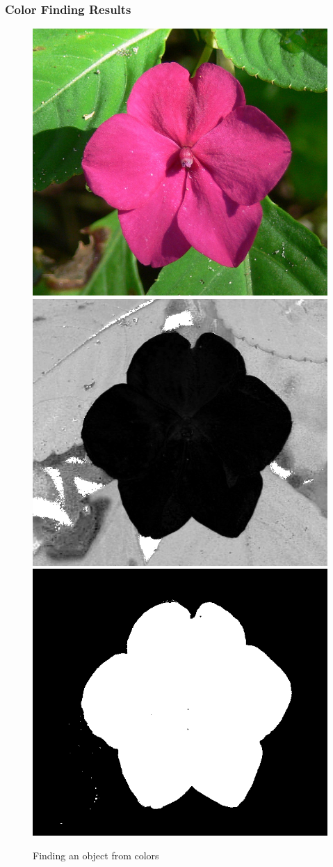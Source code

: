 \documentclass{beamer}
\begin{document}
\begin{frame}
\frametitle{Color Finding Results}
 \begin{figure}
     \includegraphics[width=0.3\linewidth]{flower.jpg}
     \quad
     \includegraphics[width=0.3\linewidth]{hflower.png}
     \quad
     \includegraphics[width=0.3\linewidth]{bflower.png}
     \quad
     \caption{Finding an object from colors}
 \end{figure}
\end{frame}
\end{document}
